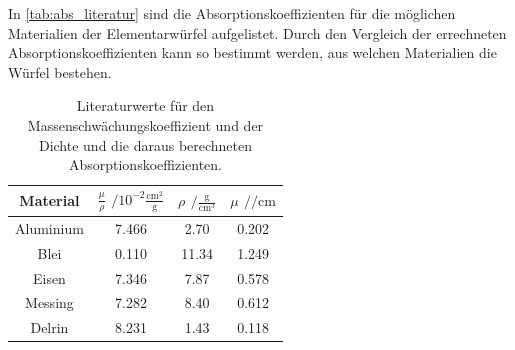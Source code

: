 In \autoref{tab:abs_literatur} sind die Absorptionskoeffizienten für die möglichen Materialien der Elementarwürfel aufgelistet.
Durch den Vergleich der errechneten Absorptionskoeffizienten kann so bestimmt werden, aus welchen Materialien die Würfel bestehen.

\begin{table}[H]
    \centering
    \caption{Literaturwerte für den Massenschwächungskoeffizient \cite{NIST2} und der Dichte \cite{Chemie.de} und die daraus berechneten Absorptionskoeffizienten.}
    \label{tab:abs_literatur}
    \begin{tabular}{c S S[table-format=2.2] S}
        \toprule
       {Material}& {$\frac{\mu}{\rho}$ $/ 10^{-2}\frac{\si{\centi\meter^2}}{\si{\g}}$} & {$\rho$ $/ \frac{\si{\g}}{\si{\centi\meter^3}}$} & {$\mu$ $/ \si{\per\centi\meter}$} \\
        \midrule
        {Aluminium} & 7.466 & 2.70 & 0.202 \\
        {Blei} & 0.110 & 11.34 & 1.249\\
        {Eisen} & 7.346 & 7.87 & 0.578 \\ 
        {Messing} & 7.282 & 8.40 & 0.612 \\ 
        {Delrin} & 8.231 & 1.43 & 0.118 \\  
        \bottomrule
    \end{tabular}
\end{table}
